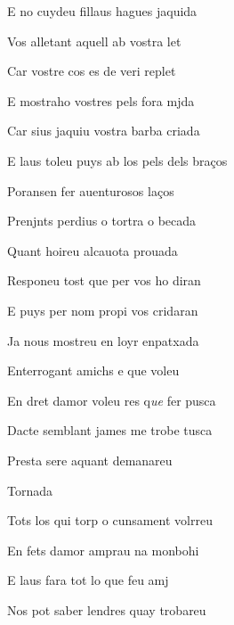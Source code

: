 \documentclass[12pt]{article}
\begin{document}
\begin{estrofa}

 E no cuydeu fillaus hagues jaquida

 Vos alletant aquell ab vostra let

 Car vostre cos es de veri replet

 E mostraho vostres pels fora mjda

 Car sius jaquiu vostra barba criada

 E laus toleu puys ab los pels dels bra\c{c}os

 Poransen fer auenturosos la\c{c}os

 Prenjnts perdius o tortra o becada

\end{estrofa}



\begin{estrofa}

 Quant hoireu alcauota prouada

 Responeu tost que per vos ho diran

 E puys per nom propi vos cridaran

 Ja nous mostreu en loyr enpatxada

 Enterrogant amichs e que voleu

 En dret damor voleu res q\textit{ue} fer pusca

 Dacte semblant james me trobe tusca

 Presta sere aquant demanareu

\end{estrofa}


\begin{estrofaExtra}%




\begin{tornada}

\pagina{[36r]} Tornada

\end{tornada}


\end{estrofaExtra}


\begin{estrofa}

 Tots los qui torp o cunsament volrreu

 En fets damor amprau na monbohi

 E laus fara tot lo que feu amj

 Nos pot saber lendres quay trobareu

\end{estrofa}
\end{document}
